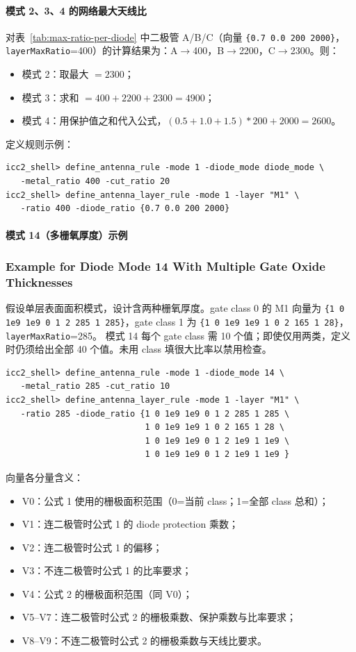 \paragraph{模式 2、3、4 的网络最大天线比}
对表~\ref{tab:max-ratio-per-diode} 中二极管 A/B/C（向量 \texttt{\{0.7 0.0 200 2000\}}，\texttt{layerMaxRatio}=400）的计算结果为：A$\to$400，B$\to$2200，C$\to$2300。则：
\begin{itemize}
  \item 模式 2：取最大 $=2300$；
  \item 模式 3：求和 $=400+2200+2300=4900$；
  \item 模式 4：用保护值之和代入公式，\((0.5+1.0+1.5)*200+2000=2600\)。
\end{itemize}

定义规则示例：
\begin{lstlisting}
icc2_shell> define_antenna_rule -mode 1 -diode_mode diode_mode \
   -metal_ratio 400 -cut_ratio 20
icc2_shell> define_antenna_layer_rule -mode 1 -layer "M1" \
   -ratio 400 -diode_ratio {0.7 0.0 200 2000}
\end{lstlisting}

\paragraph{模式 14（多栅氧厚度）示例}
\subsubsection*{Example for Diode Mode 14 With Multiple Gate Oxide Thicknesses}

假设单层表面面积模式，设计含两种栅氧厚度。gate class 0 的 M1 向量为
\texttt{\{1 0 1e9 1e9 0 1 2 285 1 285\}}，gate class 1 为
\texttt{\{1 0 1e9 1e9 1 0 2 165 1 28\}}，\texttt{layerMaxRatio}=285。
模式 14 每个 gate class 需 10 个值；即使仅用两类，定义时仍须给出全部 40 个值。未用 class 填很大比率以禁用检查。

\begin{lstlisting}
icc2_shell> define_antenna_rule -mode 1 -diode_mode 14 \
   -metal_ratio 285 -cut_ratio 10
icc2_shell> define_antenna_layer_rule -mode 1 -layer "M1" \
   -ratio 285 -diode_ratio {1 0 1e9 1e9 0 1 2 285 1 285 \
                            1 0 1e9 1e9 1 0 2 165 1 28 \
                            1 0 1e9 1e9 0 1 2 1e9 1 1e9 \
                            1 0 1e9 1e9 0 1 2 1e9 1 1e9 }
\end{lstlisting}

向量各分量含义：
\begin{itemize}
  \item V0：公式 1 使用的栅极面积范围（0=当前 class；1=全部 class 总和）；
  \item V1：连二极管时公式 1 的 diode protection 乘数；
  \item V2：连二极管时公式 1 的偏移；
  \item V3：不连二极管时公式 1 的比率要求；
  \item V4：公式 2 的栅极面积范围（同 V0）；
  \item V5--V7：连二极管时公式 2 的栅极乘数、保护乘数与比率要求；
  \item V8--V9：不连二极管时公式 2 的栅极乘数与天线比要求。
\end{itemize}

